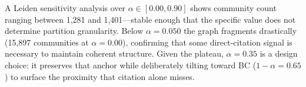 A Leiden sensitivity analysis over $\alpha \in [0.00, 0.90]$ shows community count ranging between 1,281 and 1,401---stable enough that the specific value does not determine partition granularity. Below $\alpha = 0.050$ the graph fragments drastically (15,897 communities at $\alpha = 0.00$), confirming that some direct-citation signal is necessary to maintain coherent structure. Given the plateau, $\alpha = 0.35$ is a design choice: it preserves that anchor while deliberately tilting toward BC ($1 - \alpha = 0.65$) to surface the proximity that citation alone misses.
